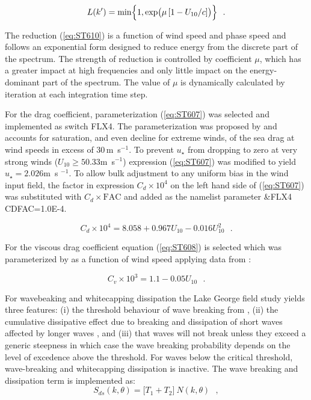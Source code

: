\begin{equation}\label{eq:ST610}
L(k^\prime) = \min \Bigl \{ 1, \exp \bigl ( \mu\,[1- U_{10}/c] \bigr ) \Bigr
\}  \:\:\: .
\end{equation}

\noindent
The reduction (\ref{eq:ST610}) is a function of wind speed and phase speed and
follows an exponential form designed to reduce energy from the discrete part
of the spectrum. The strength of reduction is controlled by coefficient $\mu$,
which has a greater impact at high frequencies and only little impact on the
energy-dominant part of the spectrum. The value of $\mu$ is dynamically
calculated by iteration at each integration time step.

For the drag coefficient, parameterization (\ref{eq:ST607}) was selected and
implemented as switch {\code FLX4}. The parameterization was proposed by
\citet{art:Hwa11} and accounts for saturation, and even decline 
for extreme winds, of the sea drag at wind speeds in excess of 30\,m~s$^{-1}$.
To prevent $u_\star$ from dropping to zero at very strong winds
($U_{10}\ge50.33$m~s$^{-1}$) expression (\ref{eq:ST607}) was modified to yield
$u_\star=2.026$m~s $^{-1}$. To allow bulk adjustment to any uniform bias in
the wind input field, the factor in expression $C_d \times 10^4$ on the left
hand side of (\ref{eq:ST607}) was substituted with $C_d \times \mathrm{FAC}$
and added as the namelist parameter {\code \&FLX4 CDFAC=1.0E-4}.

\begin{equation}\label{eq:ST607}
C_d \times 10^4 = 8.058 + 0.967 U_{10} - 0.016 U_{10}^2 \:\:\: .
\end{equation}

\noindent
For the viscous drag coefficient equation (\ref{eq:ST608}) is selected which
was parameterized by \citet{art:Tea10} as a function of wind speed applying
data from \citet{art:BP98}:

\begin{equation}\label{eq:ST608}
  C_v \times 10^3 = 1.1 - 0.05 U_{10} \:\:\: .
\end{equation}

\noindent
For wavebeaking and whitecapping dissipation the Lake George field study
yields three features: (i) the threshold behaviour of wave breaking from
\citep{art:BBY00,art:BGM02}, (ii) the cumulative dissipative effect due to
breaking and dissipation of short waves affected by longer waves
\citep{pro:Don01, pro:BY05, art:YB06, art:Bea10}, and (iii) that waves 
will not break unless they exceed a generic steepness in which case the wave
breaking probability depends on the level of excedence above the threshold.
For waves below the critical threshold, wave-breaking and whitecapping
dissipation is inactive. The wave breaking and dissipation term is implemented
as:
\begin{equation}\label{eq:ST620}
  S_{ds}(k,\theta) = \bigl [ T_1 + T_2 \bigr ]\ N(k,\theta) \:\:\: ,
\end{equation}

